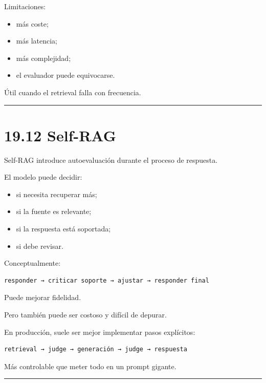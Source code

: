 Limitaciones:

\begin{itemize}
\tightlist
\item
  más coste;
\item
  más latencia;
\item
  más complejidad;
\item
  el evaluador puede equivocarse.
\end{itemize}

Útil cuando el retrieval falla con frecuencia.

\begin{center}\rule{0.5\linewidth}{0.5pt}\end{center}

\section{19.12 Self-RAG}\label{self-rag}

Self-RAG introduce autoevaluación durante el proceso de respuesta.

El modelo puede decidir:

\begin{itemize}
\tightlist
\item
  si necesita recuperar más;
\item
  si la fuente es relevante;
\item
  si la respuesta está soportada;
\item
  si debe revisar.
\end{itemize}

Conceptualmente:

\begin{lstlisting}
responder → criticar soporte → ajustar → responder final
\end{lstlisting}

Puede mejorar fidelidad.

Pero también puede ser costoso y difícil de depurar.

En producción, suele ser mejor implementar pasos explícitos:

\begin{lstlisting}
retrieval → judge → generación → judge → respuesta
\end{lstlisting}

Más controlable que meter todo en un prompt gigante.

\begin{center}\rule{0.5\linewidth}{0.5pt}\end{center}


